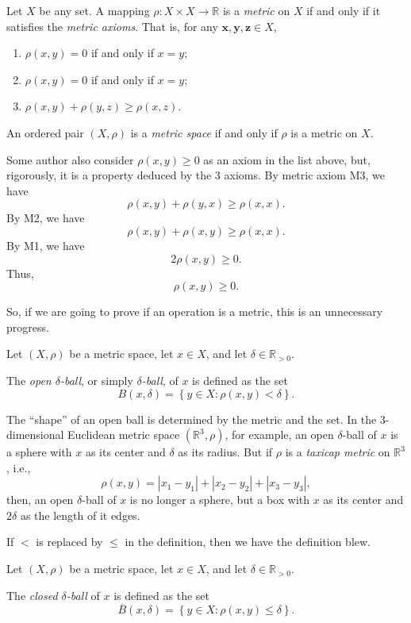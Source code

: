 \documentclass{report}
\begin{document}
\begin{definition}
	Let $X$ be any set. A mapping $\rho: X \times X \to \mathbb R$ is a \textit{metric} on $X$ if and only if it satisfies the \textit{metric axioms}. That is, for any $\mathbf x, \mathbf y, \mathbf z \in X$,
	\begin{enumerate}[(M1)]
		\item $\rho(x, y) = 0$ if and only if $x = y$;
		\item $\rho(x, y) = 0$ if and only if $x = y$;
		\item $\rho(x, y) + \rho(y, z) \ge \rho(x, z)$.
	\end{enumerate}
	
	An ordered pair $(X, \rho)$ is a \textit{metric space} if and only if $\rho$ is a metric on $X$.
\end{definition}

Some author also consider $\rho(x, y) \ge 0$ as an axiom in the list above, but, rigorously, it is a property deduced by the 3 axioms. By metric axiom M3, we have
$$
\rho(x, y) + \rho(y, x) \ge \rho (x, x).
$$
By M2, we have
$$
\rho(x, y) + \rho(x,y) \ge \rho(x, x).
$$
By M1, we have
$$
2\rho (x,y) \ge 0.
$$
Thus,
$$
\rho(x,y) \ge 0.
$$

So, if we are going to prove if an operation is a metric, this is an unnecessary progress.


\begin{definition}
	Let $(X, \rho)$ be a metric space, let $x \in X$, and let $\delta \in \mathbb R_{> 0}$.

	The \textit{open $\delta$-ball}, or simply \textit{$\delta$-ball}, of $x$ is defined as the set
	$$
	B(x, \delta) = \left\{ y \in X: \rho(x,y) < \delta \right\}.
	$$
\end{definition}


The “shape” of an open ball is determined by the metric and the set. In the 3-dimensional Euclidean metric space $(\mathbb R^3, \rho)$, for example, an open $\delta$-ball of $x$ is a sphere with $x$ as its center and $\delta$ as its radius. But if $\rho$ is a \textit{taxicap metric} on $\mathbb R^3$, i.e.,
$$
\rho(x,y) = |x_1 - y_1| + |x_2 - y_2| + |x_3 - y_3|,
$$
then, an open $\delta$-ball of $x$ is no longer a sphere, but a box with $x$ as its center and $2\delta$ as the length of it edges.

If $<$ is replaced by $\le$ in the definition, then we have the definition blew.


\begin{definition}
	Let $(X, \rho)$ be a metric space, let $x \in X$, and let $\delta \in \mathbb R_{> 0}$.
	
	The \textit{closed $\delta$-ball} of $x$ is defined as the set
	$$
	\overline B(x, \delta) = \left\{ y \in X: \rho(x,y) \le \delta \right\}.
	$$
\end{definition}
\end{document}
